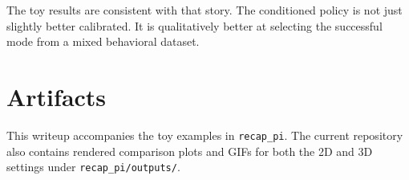 \documentclass[11pt]{article}
\begin{document}
The toy results are consistent with that story. The conditioned policy is not just slightly better calibrated. It is qualitatively better at selecting the successful mode from a mixed behavioral dataset.

\section*{Artifacts}

This writeup accompanies the toy examples in \texttt{recap\_pi}. The current repository also contains rendered comparison plots and GIFs for both the 2D and 3D settings under \texttt{recap\_pi/outputs/}.
\end{document}
